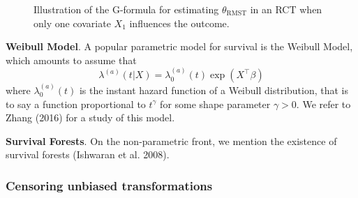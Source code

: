\documentclass[
  11pt,
  a4paper,
]{article}
\theoremstyle{plain}
\theoremstyle{plain}
\theoremstyle{plain}
\theoremstyle{definition}
\theoremstyle{remark}
\begin{document}
\begin{figure}


\caption{\label{fig-gf}Illustration of the G-formula for estimating
\(\theta_{\mathrm{RMST}}\) in an RCT when only one covariate \(X_1\)
influences the outcome.}

\end{figure}%

\textbf{Weibull Model}. A popular parametric model for survival is the
Weibull Model, which amounts to assume that \[
\lambda^{(a)}(t|X) = \lambda_0^{(a)}(t) \exp(X^\top\beta)
\] where \(\lambda_0^{(a)}(t)\) is the instant hazard function of a
Weibull distribution, that is to say a function proportional to
\(t^{\gamma}\) for some shape parameter \(\gamma >0\). We refer to Zhang
(2016) for a study of this model.

\textbf{Survival Forests}. On the non-parametric front, we mention the
existence of survival forests (Ishwaran et al. 2008).

\subsubsection{Censoring unbiased
transformations}\label{sec-unbiasedtransfo}
\end{document}

